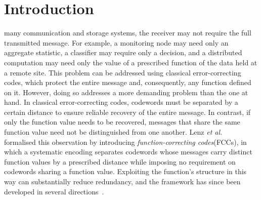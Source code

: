 \documentclass[11pt,draftclsnofoot,journal,onecolumn]{IEEEtran}
\begin{document}
\section{Introduction}
      many communication and storage systems, the receiver may not require the full transmitted message. For example, a monitoring node may need only an aggregate statistic, a classifier may require only a decision, and a distributed computation may need only the value of a prescribed function of the data held at a remote site. This problem can be addressed using classical error-correcting codes, which protect the entire message and, consequently, any function defined on it. However, doing so addresses a more demanding problem than the one at hand. In classical error-correcting codes, codewords must be separated by a certain distance to ensure reliable recovery of the entire message. In contrast, if only the function value needs to be recovered, messages that share the same function value need not be distinguished from one another. Lenz \emph{et al.}~\cite{10132545} formalised this observation by introducing \emph{function-correcting codes}(FCCs), in which a systematic encoding separates codewords whose messages carry distinct function values by a prescribed distance while imposing no requirement on codewords sharing a function value. Exploiting the function's structure in this way can substantially reduce redundancy, and the framework has since been developed in several directions~\cite{Premlal2024,ge2025,ly2025}.
\end{document}
